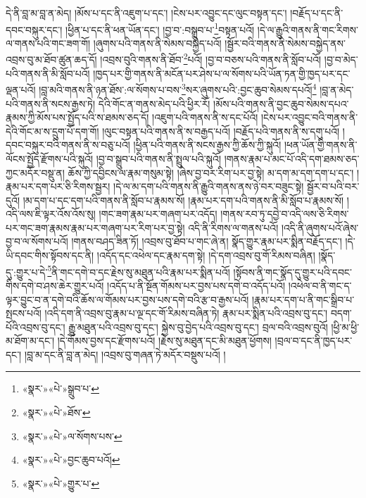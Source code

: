 དེ་ནི་བླ་མ་བླ་ན་མེད། །མོས་པ་དང་ནི་འཇུག་པ་དང་། །ངེས་པར་འབྱུང་དང་ལུང་བསྟན་དང་། །བརྗོད་པ་དང་ནི་དབང་བསྐུར་དང་། །ཕྱིན་པ་དང་ནི་ཕན་ཡོན་དང་། །བྱ་བ་:བསྒྲུབ་པ་\footnote{«སྣར་»«པེ་»སྒྲུབ་པ་}བསྟན་པའོ། །དེ་ལ་རྒྱུའི་གནས་ནི་གང་རིགས་ལ་གནས་པའི་གང་ཟག་གོ། །ཞུགས་པའི་གནས་ནི་སེམས་བསྐྱེད་པའོ། །སྦྱོར་བའི་གནས་ནི་སེམས་བསྐྱེད་ནས་འབྲས་བུ་མ་ཐོབ་ཚུན་ཆད་དོ། །འབྲས་བུའི་གནས་ནི་ཐོབ་\footnote{«སྣར་»«པེ་»ཐོས་}པའོ། །བྱ་བ་བཅས་པའི་གནས་ནི་སློབ་པའོ། །བྱ་བ་མེད་པའི་གནས་ནི་མི་སློབ་པའོ། །ཁྱད་པར་གྱི་གནས་ནི་མངོན་པར་ཤེས་པ་ལ་སོགས་པའི་ཡོན་ཏན་གྱི་ཁྱད་པར་དང་ལྡན་པའོ། །བླ་མའི་གནས་ནི་ཉན་ཐོས་:ལ་སོགས་པ་བས་\footnote{«སྣར་»«པེ་»ལ་སོགས་པས་}སར་ཞུགས་པའི་:བྱང་ཆུབ་སེམས་དཔའོ།\footnote{«སྣར་»«པེ་»བྱང་ཆུབ་པའོ།} །བླ་ན་མེད་པའི་གནས་ནི་སངས་རྒྱས་ཏེ། དེའི་གོང་ན་གནས་མེད་པའི་ཕྱིར་རོ། །མོས་པའི་གནས་ནི་བྱང་ཆུབ་སེམས་དཔའ་རྣམས་ཀྱི་མོས་པས་སྤྱོད་པའི་ས་ཐམས་ཅད་དོ། །འཇུག་པའི་གནས་ནི་ས་དང་པོའོ། །ངེས་པར་འབྱུང་བའི་གནས་ནི་དེའི་གོང་མ་ས་དྲུག་པོ་དག་གོ། །ལུང་བསྟན་པའི་གནས་ནི་ས་བརྒྱད་པའོ། །བརྗོད་པའི་གནས་ནི་ས་དགུ་པའོ། །དབང་བསྐུར་བའི་གནས་ནི་ས་བཅུ་པའོ། །ཕྱིན་པའི་གནས་ནི་སངས་རྒྱས་ཀྱི་ཆོས་ཀྱི་སྐུའོ། །ཕན་ཡོན་གྱི་གནས་ནི་ལོངས་སྤྱོད་རྫོགས་པའི་སྐུའོ། །བྱ་བ་སྒྲུབ་པའི་གནས་ནི་སྤྲུལ་པའི་སྐུའོ། །གནས་རྣམ་པ་མང་པོ་འདི་དག་ཐམས་ཅད་ཀྱང་མདོར་བསྡུ་ན། ཆོས་ཀྱི་དབྱིངས་ལ་རྣམ་གསུམ་སྟེ། །ཞེས་བྱ་བར་རིག་པར་བྱ་སྟེ། མ་དག་མ་དག་དག་པ་དང་། །རྣམ་པར་དག་པར་ཅི་རིགས་སྦྱར། །དེ་ལ་མ་དག་པའི་གནས་ནི་རྒྱུའི་གནས་ནས་ཉེ་བར་བཟུང་སྟེ། སྦྱོར་བ་པའི་བར་དུའོ། །མ་དག་པ་དང་དག་པའི་གནས་ནི་སློབ་པ་རྣམས་སོ། །རྣམ་པར་དག་པའི་གནས་ནི་མི་སློབ་པ་རྣམས་སོ། །འདི་ལས་ཇི་ལྟར་འོས་འོས་སུ། །གང་ཟག་རྣམ་པར་གཞག་པར་འདོད། །གནས་རབ་ཏུ་དབྱེ་བ་འདི་ལས་ཅི་རིགས་པར་གང་ཟག་རྣམས་རྣམ་པར་གཞག་པར་རིག་པར་བྱ་སྟེ། འདི་ནི་རིགས་ལ་གནས་པའོ། །འདི་ནི་ཞུགས་པའོ་ཞེས་བྱ་བ་ལ་སོགས་པའོ། །གནས་བཤད་ཟིན་ཏོ། །འབྲས་བུ་ཐོབ་པ་གང་ཞེ་ན། སྣོད་གྱུར་རྣམ་པར་སྨིན་བརྗོད་དང་། །དེ་ཡི་དབང་གིས་སྟོབས་དང་ནི། །འདོད་དང་འཕེལ་དང་རྣམ་དག་སྟེ། །དེ་དག་འབྲས་བུ་གོ་རིམས་བཞིན། །སྣོད་དུ་:གྱུར་པ་དེ་\footnote{«སྣར་»«པེ་»གྱུར་པ་}ནི་གང་དགེ་བ་དང་རྗེས་སུ་མཐུན་པའི་རྣམ་པར་སྨིན་པའོ། །སྟོབས་ནི་གང་སྣོད་དུ་གྱུར་པའི་དབང་གིས་དགེ་བ་ཤས་ཆེར་གྱུར་པའོ། །འདོད་པ་ནི་སྔོན་གོམས་པར་བྱས་པས་དགེ་བ་འདོད་པའོ། །འཕེལ་བ་ནི་གང་ད་ལྟར་བྱུང་བ་ན་དགེ་བའི་ཆོས་ལ་གོམས་པར་བྱས་པས་དགེ་བའི་རྩ་བ་རྒྱས་པའོ། །རྣམ་པར་དག་པ་ནི་གང་སྒྲིབ་པ་སྤངས་པའོ། །འདི་དག་ནི་འབྲས་བུ་རྣམ་པ་ལྔ་དང་གོ་རིམས་བཞིན་ཏེ། རྣམ་པར་སྨིན་པའི་འབྲས་བུ་དང་། བདག་པོའི་འབྲས་བུ་དང་། རྒྱུ་མཐུན་པའི་འབྲས་བུ་དང་། སྐྱེས་བུ་བྱེད་པའི་འབྲས་བུ་དང་། བྲལ་བའི་འབྲས་བུའོ། །ཕྱི་མ་ཕྱི་མ་ཐོག་མ་དང་། །དེ་གོམས་བྱས་དང་རྫོགས་པའོ། །རྗེས་སུ་མཐུན་དང་མི་མཐུན་ཕྱོགས། །བྲལ་བ་དང་ནི་ཁྱད་པར་དང་། །བླ་མ་དང་ནི་བླ་ན་མེད། །འབྲས་བུ་གཞན་ཏེ་མདོར་བསྡུས་པའོ། །

